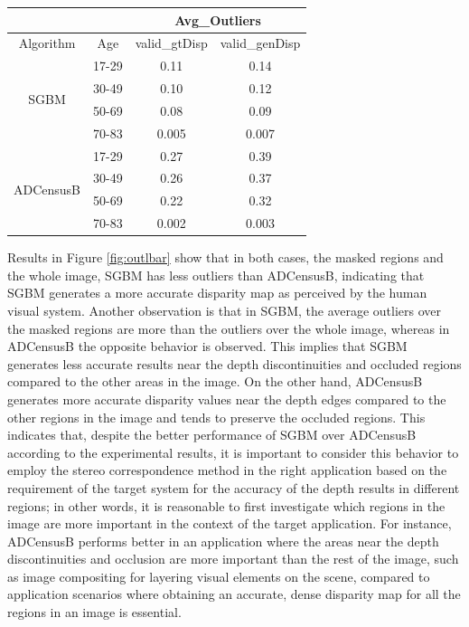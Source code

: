 \begin{minipage}{\linewidth}
\begin{center}
\label{tab:outlfull}
\begin{tabular}{ |c|c|c|c| }
\hline
\multicolumn{2}{|c}{} & \multicolumn{2}{|c|}{Avg\_Outliers} \\
\hline
Algorithm & Age & valid\_gtDisp & valid\_genDisp \\ \hline
\multirow{4}{*}{SGBM} & 17-29 & 0.11 & 0.14 \\
& 30-49 & 0.10 & 0.12 \\
& 50-69 & 0.08 & 0.09 \\
& 70-83 & 0.005 & 0.007 \\ \hline
\multirow{4}{*}{ADCensusB} & 17-29 & 0.27 & 0.39 \\
& 30-49 & 0.26 & 0.37 \\
& 50-69 & 0.22 & 0.32 \\
& 70-83 & 0.002 & 0.003 \\ \hline
\end{tabular}
\end{center}
\end{minipage} \newline \newline

Results in Figure \ref{fig:outlbar} show that in both cases, the masked regions and the whole image, SGBM has less outliers than ADCensusB, indicating that
SGBM generates a more accurate disparity map as perceived by the human visual system.
Another observation is that in SGBM, the average outliers over the masked regions are more than the outliers over the whole image, whereas in ADCensusB the
opposite behavior is observed. This implies that SGBM generates less accurate results
near the depth discontinuities and occluded regions compared to the other areas in the image.
On the other hand, ADCensusB generates more accurate disparity values near the depth edges compared to the other regions in the image and 
tends to preserve the occluded regions. This indicates that, despite the better performance of SGBM over ADCensusB according to the
experimental results, it is important to consider this behavior to employ the stereo correspondence method
in the right application based on the requirement of the target system for the accuracy of the depth results in different regions; in other
words, it is reasonable to first investigate which regions in the image are more important in the context of the target application.
For instance, ADCensusB performs better in an application where the areas
near the depth discontinuities and occlusion are more important than the rest of the image, such as image compositing for layering visual elements
on the scene, compared to application scenarios where obtaining an accurate, dense disparity map for all the regions in an image is essential.

